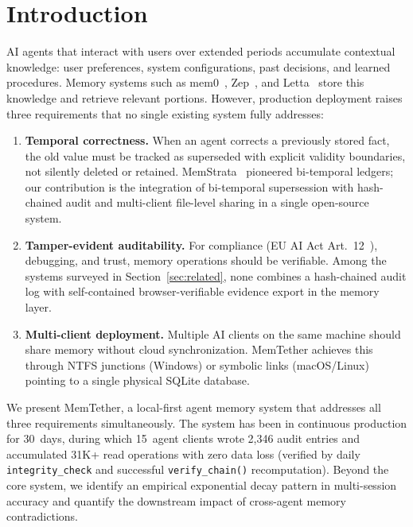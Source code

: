 \documentclass[11pt]{article}
\begin{document}
\section{Introduction}
\label{sec:intro}

AI agents that interact with users over extended periods accumulate contextual knowledge: user preferences, system configurations, past decisions, and learned procedures. Memory systems such as mem0~\cite{mem0}, Zep~\cite{zep}, and Letta~\cite{letta} store this knowledge and retrieve relevant portions. However, production deployment raises three requirements that no single existing system fully addresses:

\begin{enumerate}
\item \textbf{Temporal correctness.} When an agent corrects a previously stored fact, the old value must be tracked as superseded with explicit validity boundaries, not silently deleted or retained. MemStrata~\cite{memstrata} pioneered bi-temporal ledgers; our contribution is the integration of bi-temporal supersession with hash-chained audit and multi-client file-level sharing in a single open-source system.
\item \textbf{Tamper-evident auditability.} For compliance (EU AI Act Art.~12~\cite{euaiact}), debugging, and trust, memory operations should be verifiable. Among the systems surveyed in Section~\ref{sec:related}, none combines a hash-chained audit log with self-contained browser-verifiable evidence export in the memory layer.
\item \textbf{Multi-client deployment.} Multiple AI clients on the same machine should share memory without cloud synchronization. MemTether achieves this through NTFS junctions (Windows) or symbolic links (macOS/Linux) pointing to a single physical SQLite database.
\end{enumerate}

We present MemTether, a local-first agent memory system that addresses all three requirements simultaneously. The system has been in continuous production for 30~days, during which 15~agent clients wrote 2,346 audit entries and accumulated 31K+ read operations with zero data loss (verified by daily \texttt{integrity\_check} and successful \texttt{verify\_chain()} recomputation). Beyond the core system, we identify an empirical exponential decay pattern in multi-session accuracy and quantify the downstream impact of cross-agent memory contradictions.
\end{document}
